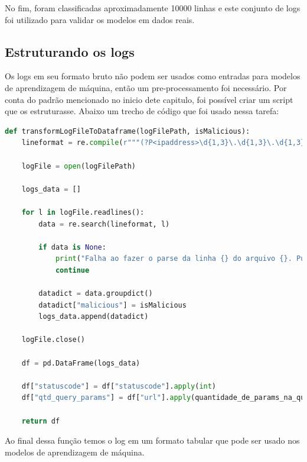 No fim, foram classificadas aproximadamente 10000 linhas e este conjunto de logs foi utilizado para validar os modelos em dados
reais.

\subsection{Estruturando os logs}

Os logs em seu formato bruto não podem ser usados como entradas para modelos de aprendizagem
de máquina, então um pre-processamento foi necessário. Por conta do padrão mencionado no inicio 
dete capitulo, foi possível criar um script que os estruturasse. Abaixo um trecho de código
que foi usado nessa tarefa:

\begin{lstlisting}[language=Python]
def transformLogFileToDataframe(logFilePath, isMalicious):
    lineformat = re.compile(r"""(?P<ipaddress>\d{1,3}\.\d{1,3}\.\d{1,3}\.\d{1,3}) - - \[(?P<dateandtime>\d{2}\/[a-z]{3}\/\d{4}:\d{2}:\d{2}:\d{2} (\+|\-)\d{4})\] ((\"(GET|POST) )(?P<url>.+)(http\/[1-2]\.[0-9]")) (?P<statuscode>\d{3}) (?P<bytessent>\d+) (?P<refferer>-|"([^"]+)") (["](?P<useragent>[^"]+)["])""", re.IGNORECASE)

    logFile = open(logFilePath)

    logs_data = []

    for l in logFile.readlines():
        data = re.search(lineformat, l)

        if data is None:
            print("Falha ao fazer o parse da linha {} do arquivo {}. Pulando..".format(l, logFile))
            continue

        datadict = data.groupdict()
        datadict["malicious"] = isMalicious
        logs_data.append(datadict)

    logFile.close()

    df = pd.DataFrame(logs_data)

    df["statuscode"] = df["statuscode"].apply(int)
    df["qtd_query_params"] = df["url"].apply(quantidade_de_params_na_query)

    return df
\end{lstlisting}

Ao final dessa função temos o log em um formato tabular que pode ser usado nos modelos de aprendizagem de máquina.
